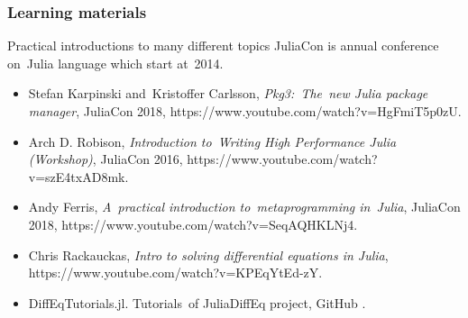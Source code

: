 \documentclass[10pt,t]{beamer}
\begin{document}
\begin{frame}
  \frametitle{Learning materials}


  {Practical introductions to many different topics}
  JuliaCon is annual conference on~Julia language which start
  at~2014.
  \begin{itemize}

  \item Stefan Karpinski and~Kristoffer Carlsson,
    \textit{Pkg3:~The~new Julia package manager}, JuliaCon 2018,
    {https://www.youtube.com/watch?v=HgFmiT5p0zU}.

  \item Arch D. Robison, \textit{Introduction to~Writing High
      Performance Julia (Workshop)}, JuliaCon 2016,
    {https://www.youtube.com/watch?v=szE4txAD8mk}.

  \item Andy Ferris, \textit{A~practical introduction
      to~metaprogramming in~Julia}, JuliaCon 2018,
    {https://www.youtube.com/watch?v=SeqAQHKLNj4}.

  \item Chris Rackauckas, \textit{Intro to solving differential
      equations in Julia},
    {https://www.youtube.com/watch?v=KPEqYtEd-zY}.

  \item DiffEqTutorials.jl. Tutorials~of JuliaDiffEq project,
    GitHub
    .

  \end{itemize}

\end{frame}
\end{document}
